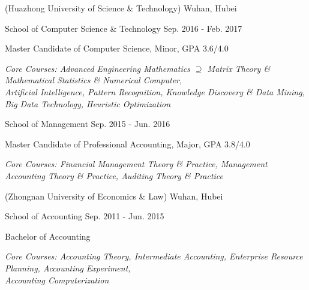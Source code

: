 \vspace{-5.0mm}

\begin{cventries}
\vspace{-1.5mm}
\cveducation
{(Huazhong University of Science \& Technology)}
{Wuhan, Hubei}

\cvsubeducation
{School of Computer Science \& Technology}
{Sep. 2016 - Feb. 2017}
{
    \begin{cvitems}
    \item {Master Candidate of Computer Science, Minor, GPA 3.6/4.0}
    \item {\itshape{Core Courses: Advanced Engineering Mathematics $\supseteq$ Matrix Theory \& Mathematical Statistics \& Numerical Computer,\\ 
    Artificial Intelligence, Pattern Recognition, Knowledge Discovery \& Data Mining, Big Data Technology, Heuristic Optimization}}
    \end{cvitems}
}
\vspace{-1.0mm}

\cvsubeducation
{School of Management}
{Sep. 2015 - Jun. 2016}
{
    \begin{cvitems}
    \item {Master Candidate of Professional Accounting, Major, GPA 3.8/4.0}
    \item {\itshape{Core Courses: Financial Management Theory \& Practice, Management Accounting Theory \& Practice, Auditing Theory \& Practice}}
    \end{cvitems}
}

\cveducation
{(Zhongnan University of Economics \& Law)}
{Wuhan, Hubei}

\cvsubeducation
{School of Accounting}
{Sep. 2011 - Jun. 2015}
{
    \begin{cvitems}
    \item {Bachelor of Accounting}
    \item {\itshape{Core Courses: Accounting Theory, Intermediate Accounting, Enterprise Resource Planning, Accounting Experiment, \\
    Accounting Computerization}}
    \end{cvitems}
}
\end{cventries}